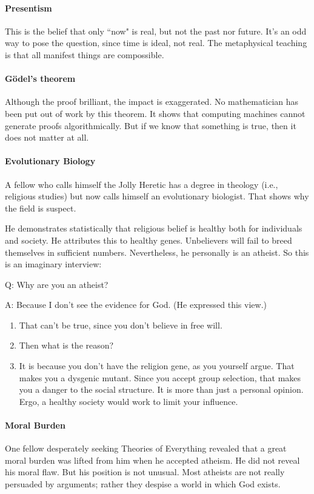 \paragraph{Presentism}
This is the belief that only ``now" is real, but not the past nor future. It's an odd way to pose the question, since time is ideal, not real. The metaphysical teaching is that all manifest things are compossible.

\paragraph{Gödel's theorem}
Although the proof brilliant, the impact is exaggerated. No mathematician has been put out of work by this theorem. It shows that computing machines cannot generate proofs algorithmically. But if we know that something is true, then it does not matter at all.

\paragraph{Evolutionary Biology}
A fellow who calls himself the Jolly Heretic has a degree in theology (i.e., religious studies) but now calls himself an evolutionary biologist. That shows why the field is suspect.

He demonstrates statistically that religious belief is healthy both for individuals and society. He attributes this to healthy genes. Unbelievers will fail to breed themselves in sufficient numbers. Nevertheless, he personally is an atheist. So this is an imaginary interview:

Q: Why are you an atheist?

A: Because I don't see the evidence for God. (He expressed this view.)

\begin{enumerate}
\item That can't be true, since you don't believe in free will. 
\item Then what is the reason? 
\item It is because you don't have the religion gene, as you yourself argue. That makes you a dysgenic mutant. Since you accept group selection, that makes you a danger to the social structure. It is more than just a personal opinion. Ergo, a healthy society would work to limit your influence. 
\end{enumerate}
\paragraph{Moral Burden}
One fellow desperately seeking Theories of Everything revealed that a great moral burden was lifted from him when he accepted atheism. He did not reveal his moral flaw. But his position is not unusual. Most atheists are not really persuaded by arguments; rather they despise a world in which God exists.

